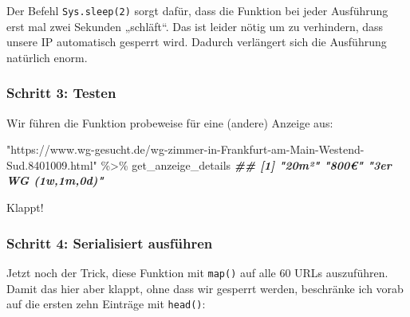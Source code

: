 \documentclass[
  ngerman,
]{article}
\newenvironment{Shaded}{\begin{snugshade}}{\end{snugshade}}
\newcommand{\DocumentationTok}[1]{\textcolor[rgb]{0.56,0.35,0.01}{\textbf{\textit{#1}}}}
\newcommand{\NormalTok}[1]{#1}
\newcommand{\SpecialCharTok}[1]{\textcolor[rgb]{0.00,0.00,0.00}{#1}}
\newcommand{\StringTok}[1]{\textcolor[rgb]{0.31,0.60,0.02}{#1}}
\begin{document}
Der Befehl \texttt{Sys.sleep(2)} sorgt dafür, dass die Funktion bei jeder Ausführung erst mal zwei Sekunden „schläft``. Das ist leider nötig um zu verhindern, dass unsere IP automatisch gesperrt wird. Dadurch verlängert sich die Ausführung natürlich enorm.

\hypertarget{schritt-3-testen-1}{%
\subsubsection{Schritt 3: Testen}\label{schritt-3-testen-1}}

Wir führen die Funktion probeweise für eine (andere) Anzeige aus:

\begin{Shaded}
\begin{Highlighting}[]
\StringTok{"https://www.wg{-}gesucht.de/wg{-}zimmer{-}in{-}Frankfurt{-}am{-}Main{-}Westend{-}Sud.8401009.html"} \SpecialCharTok{\%\textgreater{}\%}
\NormalTok{  get\_anzeige\_details}
\DocumentationTok{\#\# [1] "20m²"              "800€"              "3er WG (1w,1m,0d)"}
\end{Highlighting}
\end{Shaded}

Klappt!

\hypertarget{schritt-4-serialisiert-ausfuxfchren-1}{%
\subsubsection{Schritt 4: Serialisiert ausführen}\label{schritt-4-serialisiert-ausfuxfchren-1}}

Jetzt noch der Trick, diese Funktion mit \texttt{map()} auf alle 60 URLs auszuführen. Damit das hier aber klappt, ohne dass wir gesperrt werden, beschränke ich vorab auf die ersten zehn Einträge mit \texttt{head()}:
\end{document}

